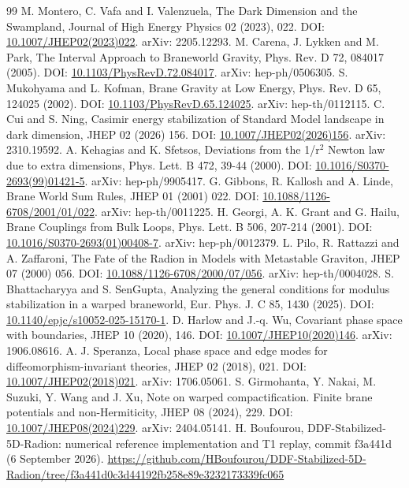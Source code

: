 \documentclass[11pt,a4paper]{article}
\begin{document}
\begin{thebibliography}{99}
 M. Montero, C. Vafa and I. Valenzuela, The Dark Dimension and the Swampland, Journal of High Energy Physics 02 (2023), 022. DOI: \href{https://doi.org/10.1007/JHEP02(2023)022}{10.1007/JHEP02(2023)022}. arXiv: 2205.12293.
 M. Carena, J. Lykken and M. Park, The Interval Approach to Braneworld Gravity, Phys. Rev. D 72, 084017 (2005). DOI: \href{https://doi.org/10.1103/PhysRevD.72.084017}{10.1103/PhysRevD.72.084017}. arXiv: hep-ph/0506305.
 S. Mukohyama and L. Kofman, Brane Gravity at Low Energy, Phys. Rev. D 65, 124025 (2002). DOI: \href{https://doi.org/10.1103/PhysRevD.65.124025}{10.1103/PhysRevD.65.124025}. arXiv: hep-th/0112115.
 C. Cui and S. Ning, Casimir energy stabilization of Standard Model landscape in dark dimension, JHEP 02 (2026) 156. DOI: \href{https://doi.org/10.1007/JHEP02(2026)156}{10.1007/JHEP02(2026)156}. arXiv: 2310.19592.
 A. Kehagias and K. Sfetsos, Deviations from the 1/r\ensuremath{{}^{2}} Newton law due to extra dimensions, Phys. Lett. B 472, 39-44 (2000). DOI: \href{https://doi.org/10.1016/S0370-2693(99)01421-5}{10.1016/S0370-2693(99)01421-5}. arXiv: hep-ph/9905417.
 G. Gibbons, R. Kallosh and A. Linde, Brane World Sum Rules, JHEP 01 (2001) 022. DOI: \href{https://doi.org/10.1088/1126-6708/2001/01/022}{10.1088/1126-6708/2001/01/022}. arXiv: hep-th/0011225.
 H. Georgi, A. K. Grant and G. Hailu, Brane Couplings from Bulk Loops, Phys. Lett. B 506, 207-214 (2001). DOI: \href{https://doi.org/10.1016/S0370-2693(01)00408-7}{10.1016/S0370-2693(01)00408-7}. arXiv: hep-ph/0012379.
 L. Pilo, R. Rattazzi and A. Zaffaroni, The Fate of the Radion in Models with Metastable Graviton, JHEP 07 (2000) 056. DOI: \href{https://doi.org/10.1088/1126-6708/2000/07/056}{10.1088/1126-6708/2000/07/056}. arXiv: hep-th/0004028.
 S. Bhattacharyya and S. SenGupta, Analyzing the general conditions for modulus stabilization in a warped braneworld, Eur. Phys. J. C 85, 1430 (2025). DOI: \href{https://doi.org/10.1140/epjc/s10052-025-15170-1}{10.1140/epjc/s10052-025-15170-1}.
 D. Harlow and J.-q. Wu, Covariant phase space with boundaries, JHEP 10 (2020), 146. DOI: \href{https://doi.org/10.1007/JHEP10(2020)146}{10.1007/JHEP10(2020)146}. arXiv: 1906.08616.
 A. J. Speranza, Local phase space and edge modes for diffeomorphism-invariant theories, JHEP 02 (2018), 021. DOI: \href{https://doi.org/10.1007/JHEP02(2018)021}{10.1007/JHEP02(2018)021}. arXiv: 1706.05061.
 S. Girmohanta, Y. Nakai, M. Suzuki, Y. Wang and J. Xu, Note on warped compactification. Finite brane potentials and non-Hermiticity, JHEP 08 (2024), 229. DOI: \href{https://doi.org/10.1007/JHEP08(2024)229}{10.1007/JHEP08(2024)229}. arXiv: 2404.05141.
 H. Boufourou, DDF-Stabilized-5D-Radion: numerical reference implementation and T1 replay, commit f3a441d (6 September 2026). \url{https://github.com/HBoufourou/DDF-Stabilized-5D-Radion/tree/f3a441d0c3d44192fb258e89e3232173339fc065}
\end{thebibliography}
\end{document}
